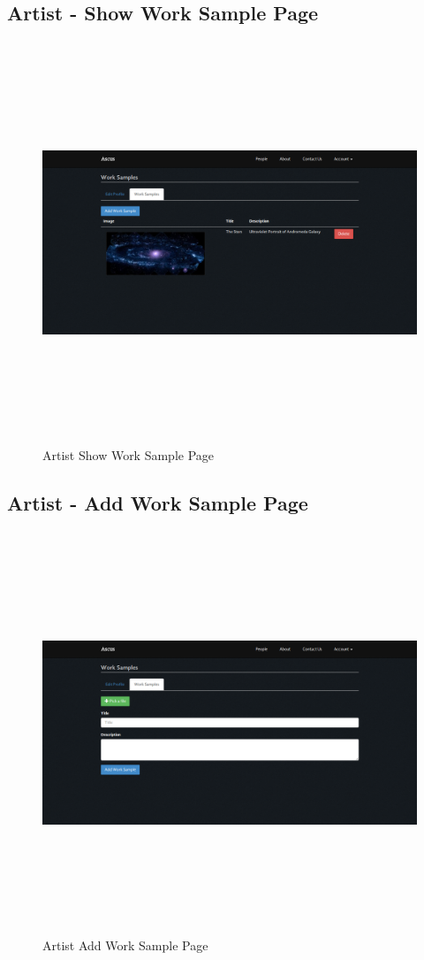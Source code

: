 \documentclass[a4paper,oneside,11pt]{report}
\begin{document}
\begin{appendices}
\pagebreak
\subsection{Artist - Show Work Sample Page}
\begin{figure}[!ht]
\centering
\includegraphics[width=\textwidth,height=12cm,keepaspectratio]{appendix/third-iteration-full-artist-show-work-sample-page.png}
\caption{Artist Show Work Sample Page}
\end{figure}


\subsection{Artist - Add Work Sample Page}
\begin{figure}[!ht]
\centering
\includegraphics[width=\textwidth,height=12cm,keepaspectratio]{appendix/third-iteration-artist-add-work-sample-page.png}
\caption{Artist Add Work Sample Page}
\end{figure}


\end{appendices}
\end{document}
